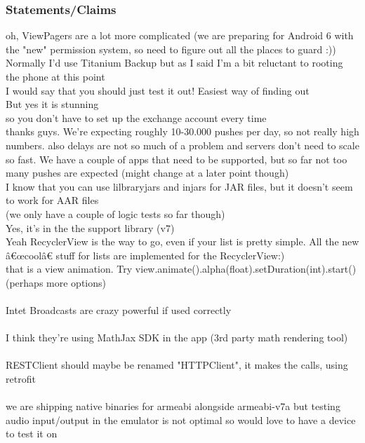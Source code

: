 \documentclass[11pt]{article}
\begin{document}
\subsubsection{Statements/Claims}

oh,  ViewPagers are a lot more complicated
(we are preparing for Android 6 with the "new" permission system, so need to figure out all the places to guard :)) \vspace{.5em} \\
Normally I'd use Titanium Backup but as I said I'm a bit reluctant to rooting the phone at this point \vspace{.5em} \\
I would say that you should just test it out! Easiest way of finding out \vspace{.5em} \\
But yes it is stunning \vspace{.5em} \\
so you don't have to set up the exchange account every time \vspace{.5em} \\
thanks guys. We're expecting roughly 10-30.000 pushes per day, so not really high numbers. also delays are not so much of a problem and servers don't need to scale so fast. We have a couple of apps that need to be supported, but so far not too many pushes are expected (might change at a later point though) \vspace{.5em} \\
I know that you can use lilbraryjars and injars for JAR files, but it doesn't seem to work for AAR files \vspace{.5em} \\
(we only have a couple of logic tests so far though) \vspace{.5em} \\
Yes, it's in the the support library (v7) \vspace{.5em} \\
Yeah RecyclerView is the way to go, even if your list is pretty simple. All the new â€œcoolâ€ stuff for lists are implemented for the RecyclerView:) \vspace{.5em} \\
that is a view animation. Try view.animate().alpha(float).setDuration(int).start()  (perhaps more options) \\ ~ \\
Intet Broadcasts are crazy powerful if used correctly \\ ~ \\
I think they're using MathJax SDK in the app (3rd party math rendering tool) \\ ~ \\
RESTClient should maybe be renamed "HTTPClient", it makes the calls, using retrofit \\ ~ \\
we are shipping native binaries for armeabi alongside armeabi-v7a but testing audio input/output in the emulator is not optimal so would love to have a device to test it on
\end{document}
